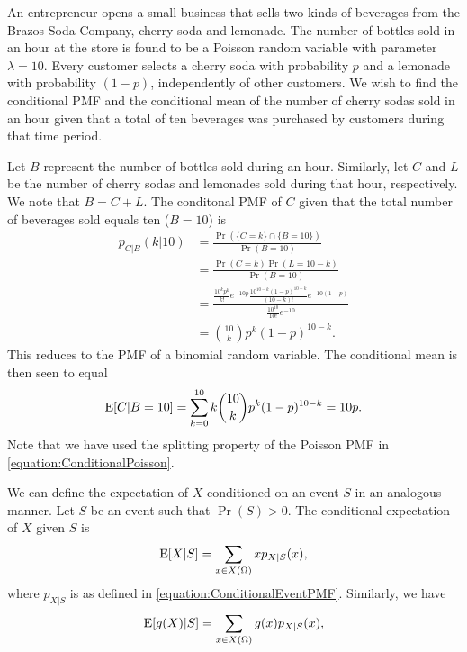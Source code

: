 \begin{example}
An entrepreneur opens a small business that sells two kinds of beverages from the Brazos Soda Company, cherry soda and lemonade.
The number of bottles sold in an hour at the store is found to be a Poisson random variable with parameter $\lambda = 10$.
Every customer selects a cherry soda with probability $p$ and a lemonade with probability $(1 - p)$, independently of other customers.
We wish to find the conditional PMF and the conditional mean of the number of cherry sodas sold in an hour given that a total of ten beverages was purchased by customers during that time period.

Let $B$ represent the number of bottles sold during an hour.
Similarly, let $C$ and $L$ be the number of cherry sodas and lemonades sold during that hour, respectively.
We note that $B = C + L$.
The conditonal PMF of $C$ given that the total number of beverages sold equals ten ($B = 10$) is
\begin{equation} \label{equation:ConditionalPoisson}
\begin{split}
p_{C|B} (k | 10)
&= \frac{ \Pr \left( \{ C = k \} \cap \{ B = 10 \} \right) }
{ \Pr (B = 10) } \\
&= \frac{ \Pr ( C = k ) \Pr ( L = 10-k ) }{ \Pr (B = 10) } \\
&= \frac{ \frac{ 10^k p^k }{ k!} e^{-10p}
\frac{10^{10-k} (1-p)^{10-k}}{(10-k)!} e^{-10(1-p)} }
{ \frac{ 10^{10} }{ 10!} e^{-10} } \\
&= \binom{10}{k} p^k (1-p)^{10-k} .
\end{split}
\end{equation}
This reduces to the PMF of a binomial random variable.
The conditional mean is then seen to equal
\begin{equation*}
\mathrm{E} [ C | B=10] = \sum_{k=0}^{10}
k \binom{10}{k} p^k (1-p)^{10-k} = 10 p .
\end{equation*}
Note that we have used the splitting property of the Poisson PMF in \eqref{equation:ConditionalPoisson}.
\end{example}

We can define the expectation of $X$ conditioned on an event $S$ in an analogous manner.
Let $S$ be an event such that $\Pr (S) > 0$.
The conditional expectation of $X$ given $S$ is
\begin{equation*}
\mathrm{E} [X | S] = \sum_{x \in X(\Omega)} x p_{X|S} (x) ,
\end{equation*}
where $p_{X|S}$ is as defined in \eqref{equation:ConditionalEventPMF}.
Similarly, we have
\begin{equation*}
\mathrm{E} [g(X) | S] = \sum_{x \in X(\Omega)} g(x) p_{X|S} (x) ,
\end{equation*}

